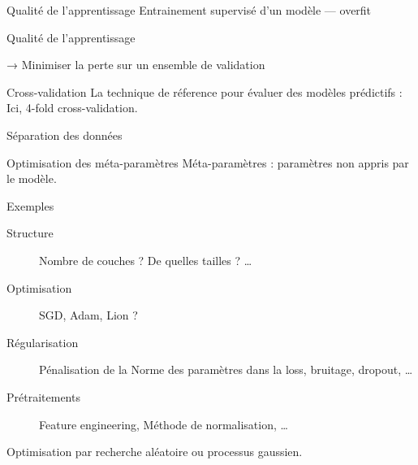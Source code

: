 \begin{frame}{Qualité de l'apprentissage}
  Entrainement supervisé d'un modèle — overfit


\end{frame}

\begin{frame}{Qualité de l'apprentissage}


  → Minimiser la perte sur un ensemble de validation
\end{frame}

\begin{frame}{Cross-validation}
  La technique de réference pour évaluer des modèles prédictifs :
  Ici, 4-fold cross-validation.
\end{frame}

\begin{frame}{Séparation des données}
\end{frame}

\begin{frame}{Optimisation des méta-paramètres}
  Méta-paramètres : paramètres \alert{non appris} par le modèle.
  \begin{exampleblock}{Exemples}
    \begin{description}
    \item [Structure] Nombre de couches ? De quelles tailles ? …
    \item [Optimisation] SGD, Adam, Lion ?
    \item [Régularisation] Pénalisation de la Norme des paramètres dans la loss, bruitage, dropout, …
    \item [Prétraitements] Feature engineering, Méthode de normalisation, …
    \end{description}
  \end{exampleblock}
  Optimisation par recherche aléatoire ou processus gaussien.
\end{frame}
